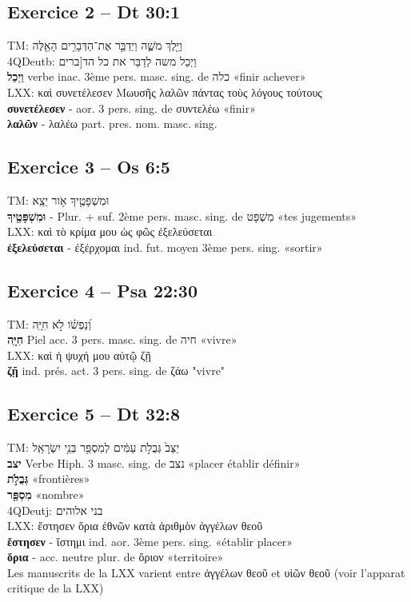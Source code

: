 \documentclass[11pt,a4paper]{article}
\begin{document}
\subsection*{Exercice 2 – Dt 30:1}
TM: \texthebrew{וַיֵּ֖לֶךְ מֹשֶׁ֑ה וַיְדַבֵּ֛ר אֶת־הַדְּבָרִ֥ים הָאֵ֖לֶּה} \\
4QDeutb: \texthebrew{וַיְכַל משה לְדַבֵּר את כל הד[ברים} \\
\textbf{וַיְכַל} verbe inac. 3ème pers. masc. sing. de \texthebrew{כלה} «finir achever» \\
LXX: \textgreek{καὶ συνετέλεσεν Μωυσῆς λαλῶν πάντας τοὺς λόγους τούτους} \\
\textbf{συνετέλεσεν} - aor. 3 pers. sing. de \textgreek{συντελέω} «finir» \\
\textbf{λαλῶν} - \textgreek{λαλέω} part. pres. nom. masc. sing.

\subsection*{Exercice 3 – Os 6:5}
TM: \texthebrew{וּמִשְׁפָּטֶ֖יךָ אֹ֥ור יֵצֵֽא} \\
\textbf{וּמִשְׁפָּטֶ֖יךָ} - Plur. + suf. 2ème pers. masc. sing. de \texthebrew{מִשְׁפָּט} «tes jugements» \\
LXX: \textgreek{καὶ τὸ κρίμα μου ὡς φῶς ἐξελεύσεται} \\
\textbf{ἐξελεύσεται} - \textgreek{ἐξέρχομαι} ind. fut. moyen 3ème pers. sing. «sortir»

\subsection*{Exercice 4 – Psa 22:30}
TM: \texthebrew{וְ֝נַפְשֹׁ֗ו לֹ֣א חִיָּֽה} \\
\textbf{חִיָּֽה} Piel acc. 3 pers. masc. sing. de \texthebrew{חיה} «vivre» \\
LXX: \textgreek{καὶ ἡ ψυχή μου αὐτῷ ζῇ} \\
\textbf{ζῇ} ind. prés. act. 3 pers. sing. de \textgreek{ζάω} "vivre"

\subsection*{Exercice 5 – Dt 32:8}
TM: \texthebrew{יַצֵּב֙ גְּבֻלֹ֣ת עַמִּ֔ים לְמִסְפַּ֖ר בְּנֵ֥י יִשְׂרָאֵֽל} \\
\textbf{יצב} Verbe Hiph. 3 masc. sing. de \texthebrew{נצב} «placer établir définir» \\
\textbf{גְּבֻלֹ֣ת} «frontières» \\
\textbf{מִסְפַּ֖ר} «nombre» \\
4QDeutj: \texthebrew{בני אלוהים} \\
LXX: \textgreek{ἔστησεν ὅρια ἐθνῶν κατὰ ἀριθμὸν ἀγγέλων θεοῦ} \\
\textbf{ἔστησεν} - \textgreek{ἵστημι} ind. aor. 3ème pers. sing. «établir placer» \\
\textbf{ὅρια} - acc. neutre plur. de \textgreek{ὅριον} «territoire» \\
Les manuscrits de la LXX varient entre \textgreek{ἀγγέλων θεοῦ} et \textgreek{υἱῶν θεοῦ} (voir l’apparat critique de la LXX)
\end{document}
